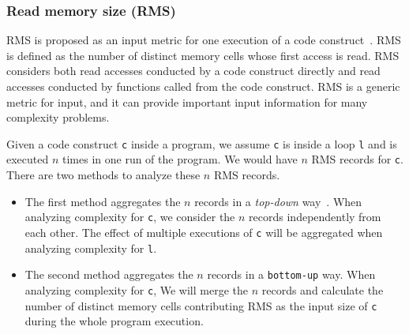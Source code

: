 \subsubsection{Read memory size (RMS)}
RMS is proposed as an input metric for one 
execution of a code construct~\cite{Aprof1,Aprof2}. 
RMS is defined as the number of distinct memory cells 
whose first access is read. 
RMS considers both read accesses conducted by a code construct directly 
and read accesses conducted by 
functions called from the code construct. 
RMS is a generic metric for input, 
and it can provide important input information for many complexity problems.   

Given a code construct \texttt{c} inside a program, 
we assume \texttt{c} is inside a loop \texttt{l} and is executed
$n$ times in one run of the program. 
We would have $n$ RMS records for \texttt{c}. 
There are two methods to analyze these $n$ RMS records.

\begin{itemize}

\item The first method aggregates the $n$ records in a \textit{top-down} way~\cite{Aprof1,Aprof2}.
When analyzing complexity for \texttt{c}, 
we consider the $n$ records independently from each other. 
The effect of multiple executions of \texttt{c} 
will be aggregated when analyzing complexity for \texttt{l}.

\item The second method aggregates the $n$ records in a \texttt{bottom-up} way.
When analyzing complexity for \texttt{c}, 
We will merge the $n$ records and calculate the number of distinct memory cells 
contributing RMS as the input size of \texttt{c} during the whole program execution.

\end{itemize}





